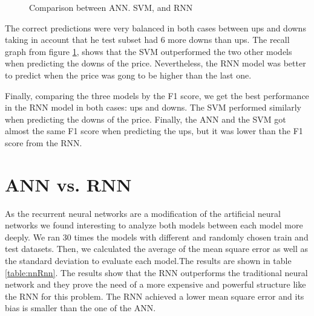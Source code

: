 \begin{figure}
\center
{} 
\caption{Comparison between ANN. SVM, and RNN}
\label{fig:comparison}
\end{figure}

The correct predictions were very balanced in both cases between ups and downs taking in account that he test subset had 6 more downs than ups. The recall graph from figure \ref{fig:comparison}, shows that the SVM outperformed the two other models when predicting the downs of the price. Nevertheless, the RNN model was better to predict when the price was gong to be higher than the last one.

Finally, comparing the three models by the F1 score, we get the best performance in the RNN model in both cases: ups and downs. The SVM performed similarly when predicting the downs of the price. Finally, the ANN and the SVM got almost the same F1 score when predicting the ups, but it was lower than the F1 score from the RNN. 

\section{ANN vs. RNN}
As the recurrent neural networks are a modification of the artificial neural networks we found interesting to analyze both models between each model more deeply. We ran 30 times the models with different and randomly chosen train and test datasets. Then, we calculated the average of the mean square error as well as the standard deviation to evaluate each model.The results are shown in table 
\ref{table:nnRnn}. The results show that the RNN outperforms the traditional neural network and they prove the need of a more expensive and powerful structure like the RNN for this problem. The RNN achieved a lower mean square error and its bias is smaller than the one of the ANN.

